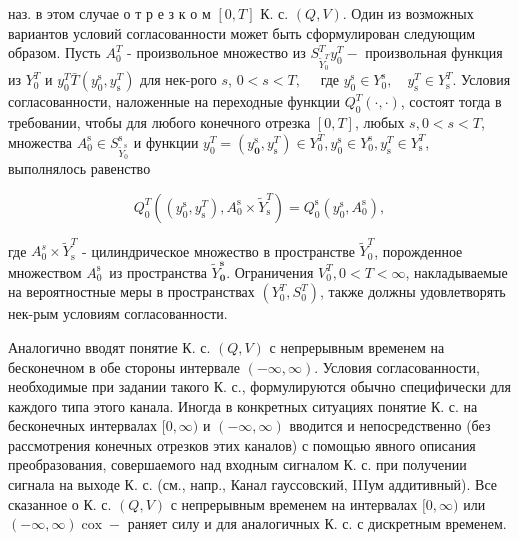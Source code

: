 \documentclass[10pt]{article}
\begin{document}
наз. в этом случае о т р е з к о м $[0, T]$ К. с. $(Q, V)$. Один из возможных вариантов условий согласованности может быть сформулирован следующим образом. Пусть $A_{0}^{T}$ - произвольное множество из $S_{\tilde{Y}_{0}^{T}}^{T} y_{0}^{T}-$ произвольная функция из $Y_{0}^{T}$ и $y_{0}^{T} \bar{T}\left(y_{0}^{\mathrm{s}}, y_{\mathrm{s}}^{T}\right)$ для нек-рого $s$, $0<s<T, \quad$ где $y_{0}^{\mathrm{s}} \in Y_{0}^{\mathrm{s}}, \quad y_{\mathrm{s}}^{T} \in Y_{\mathrm{s}}^{T}$. Условия согласованности, наложенные на переходные функции $Q_{0}^{T}(\cdot, \cdot)$, состоят тогда в требовании, чтобы для любого конечного отрезка $[0, T]$, любых $s, 0<s<T$, множества $A_{0}^{\mathrm{s}} \in S_{\tilde{Y}_{0}^{\mathrm{s}}}^{\mathrm{s}}$ и функции $y_{0}^{T}=\left(y_{\mathbf{0}}^{\mathrm{s}}, y_{\mathrm{s}}^{T}\right) \in Y_{0}^{T}, y_{0}^{\mathrm{s}} \in Y_{0}^{\mathrm{s}}, y_{\mathrm{s}}^{T} \in Y_{\mathrm{s}}^{T}$, выполнялось равенство



\[

Q_{0}^{T}\left(\left(y_{0}^{\mathrm{s}}, y_{\mathrm{s}}^{T}\right), A_{0}^{\mathrm{s}} \times \tilde{Y}_{\mathrm{s}}^{T}\right)=Q_{0}^{\mathrm{s}}\left(y_{0}^{\mathrm{s}}, A_{0}^{\mathrm{s}}\right),

\]



где $A_{0}^{s} \times \tilde{Y}_{\mathrm{s}}^{T}$ - цилиндрическое множество в пространстве $\tilde{Y}_{0}^{T}$, порожденное множеством $A_{0}^{\text {s }}$ из пространства $\tilde{Y}_{\mathbf{0}}^{\mathbf{s}}$. Ограничения $V_{0}^{T}, 0<T<\infty$, накладываемые на вероятностные меры в пространствах $\left(Y_{0}^{T}, S_{0}^{T}\right)$, также должны удовлетворять нек-рым условиям согласованности.



Аналогично вводят понятие К. с. $(Q, V)$ с непрерывным временем на бесконечном в обе стороны интервале $(-\infty, \infty)$. Условия согласованности, необходимые при задании такого К. с., формулируются обычно специфически для каждого типа этого канала. Иногда в конкретных ситуациях понятие К. с. на бесконечных интервалах $[0, \infty)$ и $(-\infty, \infty)$ вводится и непосредственно (без рассмотрения конечных отрезков этих каналов) с помощью явного описания преобразования, совершаемого над входным сигналом К. с. при получении сигнала на выходе К. с. (см., напр., Канал гауссовский, IIIум аддитивный). Все сказанное о К. с. $(Q, V)$ с непрерывным временем на интервалах $[0, \infty)$ или $(-\infty, \infty) \operatorname{cox}-$ раняет силу и для аналогичных К. с. с дискретным временем.
\end{document}
